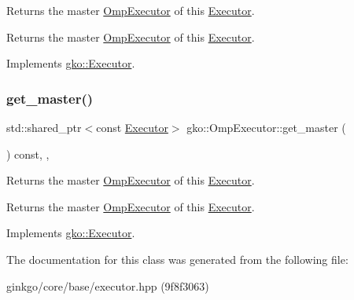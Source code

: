Returns the master \hyperlink{classgko_1_1OmpExecutor}{Omp\+Executor} of this \hyperlink{classgko_1_1Executor}{Executor}. 

\begin{DoxyReturn}{Returns}
the master \hyperlink{classgko_1_1OmpExecutor}{Omp\+Executor} of this \hyperlink{classgko_1_1Executor}{Executor}. 
\end{DoxyReturn}


Implements \hyperlink{classgko_1_1Executor_acaec4f999d52fc71e5e5a3d3ad93609c}{gko\+::\+Executor}.

\mbox{\label{classgko_1_1OmpExecutor_ab297a7eba78463784d4d2ca08b03c675}} 
\subsubsection{\texorpdfstring{get\+\_\+master()}{get\_master()}\hspace{0.1cm}{\footnotesize\ttfamily [2/2]}}
{\footnotesize\ttfamily std\+::shared\+\_\+ptr$<$const \hyperlink{classgko_1_1Executor}{Executor}$>$ gko\+::\+Omp\+Executor\+::get\+\_\+master (\begin{DoxyParamCaption}{ }\end{DoxyParamCaption}) const\hspace{0.3cm}{\ttfamily [override]}, {\ttfamily [virtual]}, {\ttfamily [noexcept]}}



Returns the master \hyperlink{classgko_1_1OmpExecutor}{Omp\+Executor} of this \hyperlink{classgko_1_1Executor}{Executor}. 

\begin{DoxyReturn}{Returns}
the master \hyperlink{classgko_1_1OmpExecutor}{Omp\+Executor} of this \hyperlink{classgko_1_1Executor}{Executor}. 
\end{DoxyReturn}


Implements \hyperlink{classgko_1_1Executor_a261386e439c8daa6e0d95dc331b9bfeb}{gko\+::\+Executor}.



The documentation for this class was generated from the following file\+:\begin{DoxyCompactItemize}
\item 
ginkgo/core/base/executor.\+hpp (9f8f3063)\end{DoxyCompactItemize}
